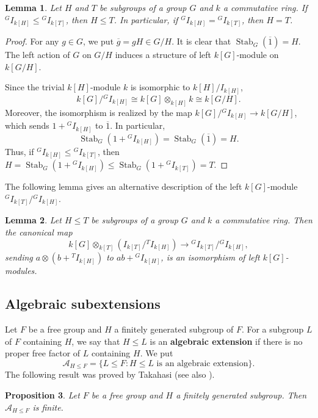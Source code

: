 \documentclass{amsart}
\newtheorem{lem}{Lemma}[section]
\newtheorem{pro}[lem]{Proposition}
\theoremstyle{definition}
\theoremstyle{remark}
\DeclareMathOperator{\Stab}{Stab}
\begin{document}
\begin{lem}\label{permutationmodule}
Let $H$ and $ T$ be subgroups of a group $G$ and $k$ a commutative ring.  If ${}^GI_{k[H]}\le {}^GI_{k[T]}$, then $H\le T$. In particular, if ${}^GI_{k[H]}= {}^GI_{k[T]}$, then $H=T$.
\end{lem}
\begin{proof} For any $g\in G$, we put $\overline g=gH\in G/H$. It is clear that $\Stab_G(\overline 1)=H$.
The left action of $G$ on $G/H$ induces a structure of left $k[G]$-module on $k[G/H]$. 

 Since the trivial $k[H]$-module $k$ is isomorphic to  $k[H]/I_{k[H]}$, $$k[G]/{}^GI_{k[H]}\cong k[G]\otimes _{k[H]} k  \cong k[G/H].$$ Moreover, the isomorphism is realized by the map $k[G]/{}^GI_{k[H]}\to k[G/H]$, which sends $1+{}^GI_{k[H]}$ to $\overline 1$. In particular,
$$\Stab_G(1+{}^GI_{k[H]})=\Stab_G(\overline 1)=H.$$
Thus, if ${}^GI_{k[H]}\le {}^GI_{k[T]}$, then $H=\Stab_G(1+{}^GI_{k[H]})\le \Stab_G(1+{}^GI_{k[T]})=T.$
\end{proof}
The following lemma gives an alternative description of the left $k[G]$-module ${}^GI_{k[T]}/{}^GI_{k[H]} $.
\begin{lem} \label{isomdiscr} \cite[Lemma 2.1]{Ja24}Let $H\le T$ be      subgroups of a group $G$ and $k$ a commutative ring. Then the canonical map  $$k[G]\otimes_{k[T]} (I_{k[T]}/{}^TI_{k[H]}) \to {}^GI_{k[T]}/{}^GI_{k[H]} ,$$ sending $a\otimes (b+{}^TI_{k[H]})$ to $ab+{}^GI_{k[H]}$, is an isomorphism of left $k[G]$-modules.
\end{lem}

\subsection{Algebraic subextensions}
Let $F$ be a free group and $H$ a finitely generated subgroup of $F$. For a subgroup $L$ of $F$  containing $H$, we say that $H\leq L$ is an {\bf algebraic extension} if there is no   proper free factor of $L$ containing $H$.
We put $$\mathcal A_{H\leq F}=\{L\leq F: H\leq L \textrm{\ is an algebraic extension}\}.$$ The following result was proved by  Takahasi \cite{Ta51} (see also \cite{MVW07}).
\begin{pro}\label{Afinite}
Let $F$ be a free group and $H$ a finitely generated subgroup. Then $\mathcal A_{H\leq F}$ is finite.
\end{pro}
\end{document}

